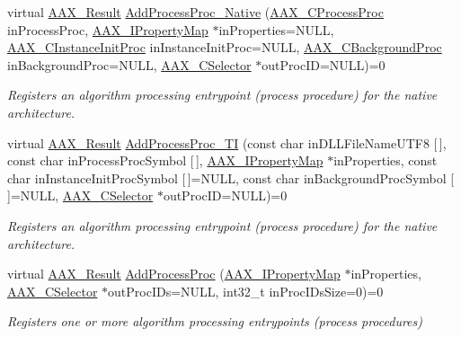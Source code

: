 \begin{DoxyCompactItemize}
virtual \mbox{\hyperlink{a00392_a4d8f69a697df7f70c3a8e9b8ee130d2f}{A\+A\+X\+\_\+\+Result}} \mbox{\hyperlink{a01781_a1c069508cf54a523905c8160ebf628ad}{Add\+Process\+Proc\+\_\+\+Native}} (\mbox{\hyperlink{a00401_ad6dd5e1aa5bd2f8462966685e3b26a6e}{A\+A\+X\+\_\+\+C\+Process\+Proc}} in\+Process\+Proc, \mbox{\hyperlink{a01869}{A\+A\+X\+\_\+\+I\+Property\+Map}} $\ast$in\+Properties=N\+U\+LL, \mbox{\hyperlink{a00401_a3963a850079d3186e08c97a1a4d0ef1c}{A\+A\+X\+\_\+\+C\+Instance\+Init\+Proc}} in\+Instance\+Init\+Proc=N\+U\+LL, \mbox{\hyperlink{a00401_aa64561d963284a3124a0821e7dc79c9a}{A\+A\+X\+\_\+\+C\+Background\+Proc}} in\+Background\+Proc=N\+U\+LL, \mbox{\hyperlink{a00392_aeaf9b387f902c50a8360ff423f4a1f23}{A\+A\+X\+\_\+\+C\+Selector}} $\ast$out\+Proc\+ID=N\+U\+LL)=0
\begin{DoxyCompactList}\small\item\em Registers an algorithm processing entrypoint (process procedure) for the native architecture. \end{DoxyCompactList}\item 
virtual \mbox{\hyperlink{a00392_a4d8f69a697df7f70c3a8e9b8ee130d2f}{A\+A\+X\+\_\+\+Result}} \mbox{\hyperlink{a01781_a38f7fb30a378a17ce9635f5c36100a3b}{Add\+Process\+Proc\+\_\+\+TI}} (const char in\+D\+L\+L\+File\+Name\+U\+T\+F8 \mbox{[}$\,$\mbox{]}, const char in\+Process\+Proc\+Symbol \mbox{[}$\,$\mbox{]}, \mbox{\hyperlink{a01869}{A\+A\+X\+\_\+\+I\+Property\+Map}} $\ast$in\+Properties, const char in\+Instance\+Init\+Proc\+Symbol \mbox{[}$\,$\mbox{]}=N\+U\+LL, const char in\+Background\+Proc\+Symbol \mbox{[}$\,$\mbox{]}=N\+U\+LL, \mbox{\hyperlink{a00392_aeaf9b387f902c50a8360ff423f4a1f23}{A\+A\+X\+\_\+\+C\+Selector}} $\ast$out\+Proc\+ID=N\+U\+LL)=0
\begin{DoxyCompactList}\small\item\em Registers an algorithm processing entrypoint (process procedure) for the native architecture. \end{DoxyCompactList}\item 
virtual \mbox{\hyperlink{a00392_a4d8f69a697df7f70c3a8e9b8ee130d2f}{A\+A\+X\+\_\+\+Result}} \mbox{\hyperlink{a01781_a0e8f6217d0f317c728b3e30f15f181d2}{Add\+Process\+Proc}} (\mbox{\hyperlink{a01869}{A\+A\+X\+\_\+\+I\+Property\+Map}} $\ast$in\+Properties, \mbox{\hyperlink{a00392_aeaf9b387f902c50a8360ff423f4a1f23}{A\+A\+X\+\_\+\+C\+Selector}} $\ast$out\+Proc\+I\+Ds=N\+U\+LL, int32\+\_\+t in\+Proc\+I\+Ds\+Size=0)=0
\begin{DoxyCompactList}\small\item\em Registers one or more algorithm processing entrypoints (process procedures) \end{DoxyCompactList}\item 

\end{DoxyCompactItemize}
